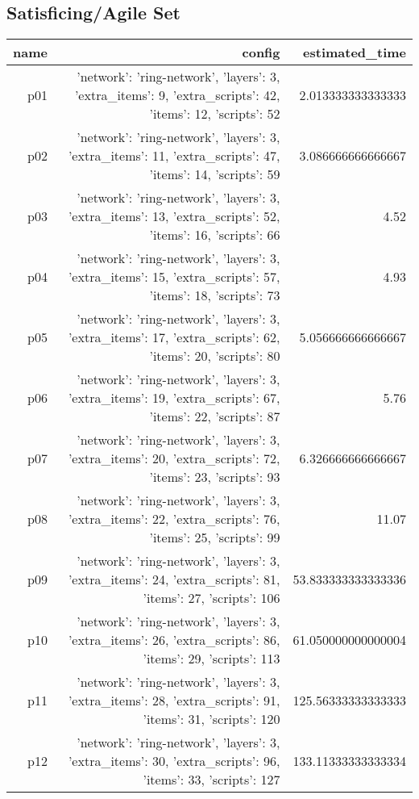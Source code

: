 \documentclass{article}
\begin{document}
                                \subsection*{Satisficing/Agile Set}
                                
                            \begin{center}
                            \scriptsize
                            \begin{tabular}{r|r|r}
                            name & config & estimated\_time\\\midrule
                              p01&{'network': 'ring-network', 'layers': 3, 'extra\_items': 9, 'extra\_scripts': 42, 'items': 12, 'scripts': 52}&2.013333333333333\\
  p02&{'network': 'ring-network', 'layers': 3, 'extra\_items': 11, 'extra\_scripts': 47, 'items': 14, 'scripts': 59}&3.086666666666667\\
  p03&{'network': 'ring-network', 'layers': 3, 'extra\_items': 13, 'extra\_scripts': 52, 'items': 16, 'scripts': 66}&4.52\\
  p04&{'network': 'ring-network', 'layers': 3, 'extra\_items': 15, 'extra\_scripts': 57, 'items': 18, 'scripts': 73}&4.93\\
  p05&{'network': 'ring-network', 'layers': 3, 'extra\_items': 17, 'extra\_scripts': 62, 'items': 20, 'scripts': 80}&5.056666666666667\\
  p06&{'network': 'ring-network', 'layers': 3, 'extra\_items': 19, 'extra\_scripts': 67, 'items': 22, 'scripts': 87}&5.76\\
  p07&{'network': 'ring-network', 'layers': 3, 'extra\_items': 20, 'extra\_scripts': 72, 'items': 23, 'scripts': 93}&6.326666666666667\\
  p08&{'network': 'ring-network', 'layers': 3, 'extra\_items': 22, 'extra\_scripts': 76, 'items': 25, 'scripts': 99}&11.07\\
  p09&{'network': 'ring-network', 'layers': 3, 'extra\_items': 24, 'extra\_scripts': 81, 'items': 27, 'scripts': 106}&53.833333333333336\\
  p10&{'network': 'ring-network', 'layers': 3, 'extra\_items': 26, 'extra\_scripts': 86, 'items': 29, 'scripts': 113}&61.050000000000004\\
  p11&{'network': 'ring-network', 'layers': 3, 'extra\_items': 28, 'extra\_scripts': 91, 'items': 31, 'scripts': 120}&125.56333333333333\\
  p12&{'network': 'ring-network', 'layers': 3, 'extra\_items': 30, 'extra\_scripts': 96, 'items': 33, 'scripts': 127}&133.11333333333334\\

\end{tabular}
\end{center}
\end{document}

